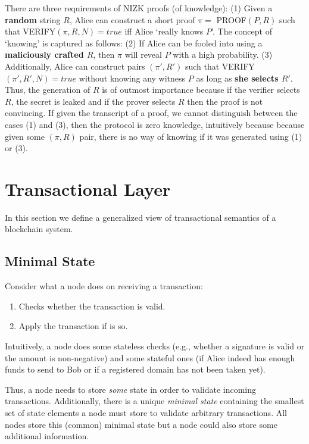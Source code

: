 \documentclass[]{report}   %
\begin{document}
\begin{enumerate}
	There are three requirements of NIZK proofs (of knowledge): (1) Given a \textbf{random} string $R$, Alice can construct a short proof $\pi=$ PROOF$(P, R)$ such that VERIFY$(\pi, R, N)=true$ iff Alice `really knows $P$'. The concept of `knowing' is captured as follows: (2) If Alice can be fooled into using a \textbf{maliciously crafted $R$}, then $\pi$ will reveal $P$ with a high probability. (3) Additionally, Alice can construct pairs $(\pi', R')$ such that VERIFY$(\pi', R', N) = true$ without knowing any witness $P$ as long as \textbf{she selects $R'$}. Thus, the generation of $R$ is of outmost importance because if the verifier selects $R$, the secret is leaked and if the prover selects $R$ then the proof is not convincing. If given the transcript of a proof, we cannot distinguish between the cases (1) and (3), then the protocol is zero knowledge, intuitively because because given some $(\pi, R)$ pair, there is no way of knowing if it was generated using (1) or (3).
\end{enumerate}



\section{Transactional Layer}

In this section we define a generalized view of transactional semantics of a blockchain system. %

\subsection{Minimal State}     %
	Consider what a node does on receiving a transaction:

    \begin{enumerate}
		\item Checks whether the transaction is valid.
		\item Apply the transaction if is so.
    \end{enumerate}

	Intuitively, a node does some stateless checks (e.g., whether a signature is valid or the amount is non-negative) and some stateful ones (if Alice indeed has enough funds to send to Bob or if a registered domain has not been taken yet). 

	Thus, a node needs to store {\em some} state in order to validate incoming transactions. Additionally, there is a unique \textit{minimal state} containing the smallest set of state elements a node must store to validate arbitrary transactions. All nodes store this (common) minimal state but a node could also store some additional information. %
\end{document}

